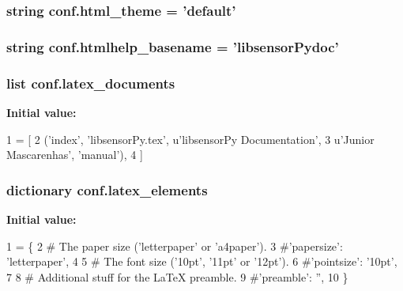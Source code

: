 \subsubsection[{html\+\_\+theme}]{\setlength{\rightskip}{0pt plus 5cm}string conf.\+html\+\_\+theme = 'default'}\label{namespaceconf_a6c3bfcc1a44546c1c75ce20f55bd0fd6}
\hypertarget{namespaceconf_aab7fddb2766ce3c430d8246fbfdbc7b1}{}
\subsubsection[{htmlhelp\+\_\+basename}]{\setlength{\rightskip}{0pt plus 5cm}string conf.\+htmlhelp\+\_\+basename = 'libsensor\+Pydoc'}\label{namespaceconf_aab7fddb2766ce3c430d8246fbfdbc7b1}
\hypertarget{namespaceconf_a7812f49970f3de0d15dd7b9b9a10e3a1}{}
\subsubsection[{latex\+\_\+documents}]{\setlength{\rightskip}{0pt plus 5cm}list conf.\+latex\+\_\+documents}\label{namespaceconf_a7812f49970f3de0d15dd7b9b9a10e3a1}
{\bfseries Initial value\+:}
\begin{DoxyCode}
1 = [
2   (\textcolor{stringliteral}{'index'}, \textcolor{stringliteral}{'libsensorPy.tex'}, \textcolor{stringliteral}{u'libsensorPy Documentation'},
3    \textcolor{stringliteral}{u'Junior Mascarenhas'}, \textcolor{stringliteral}{'manual'}),
4 ]
\end{DoxyCode}
\hypertarget{namespaceconf_a33619d385ad23765ac6ebb58bf82d43d}{}
\subsubsection[{latex\+\_\+elements}]{\setlength{\rightskip}{0pt plus 5cm}dictionary conf.\+latex\+\_\+elements}\label{namespaceconf_a33619d385ad23765ac6ebb58bf82d43d}
{\bfseries Initial value\+:}
\begin{DoxyCode}
1 = \{
2 \textcolor{comment}{# The paper size ('letterpaper' or 'a4paper').}
3 \textcolor{comment}{#'papersize': 'letterpaper',}
4 
5 \textcolor{comment}{# The font size ('10pt', '11pt' or '12pt').}
6 \textcolor{comment}{#'pointsize': '10pt',}
7 
8 \textcolor{comment}{# Additional stuff for the LaTeX preamble.}
9 \textcolor{comment}{#'preamble': '',}
10 \}
\end{DoxyCode}
\hypertarget{namespaceconf_a85efc5fee48a26fa2d651f6eeb38fc2b}{}
